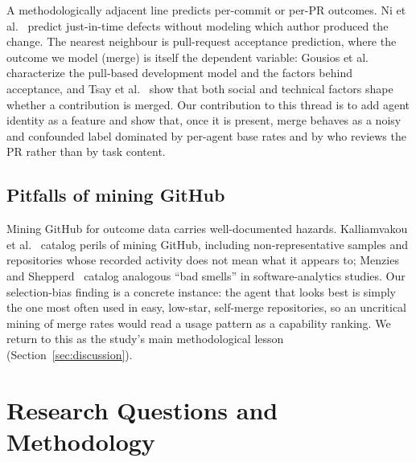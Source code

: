 \documentclass[sigconf,nonacm]{acmart}
\begin{document}
A methodologically adjacent line predicts per-commit or per-PR outcomes. Ni et al.~\cite{ni2022jit} predict just-in-time defects without modeling which author produced the change. The nearest neighbour is pull-request acceptance prediction, where the outcome we model (merge) is itself the dependent variable: Gousios et al.~\cite{gousios2014pullbased} characterize the pull-based development model and the factors behind acceptance, and Tsay et al.~\cite{tsay2014influence} show that both social and technical factors shape whether a contribution is merged. Our contribution to this thread is to add agent identity as a feature and show that, once it is present, merge behaves as a noisy and confounded label dominated by per-agent base rates and by who reviews the PR rather than by task content.

\subsection{Pitfalls of mining GitHub}

Mining GitHub for outcome data carries well-documented hazards. Kalliamvakou et al.~\cite{kalliamvakou2016promises} catalog perils of mining GitHub, including non-representative samples and repositories whose recorded activity does not mean what it appears to; Menzies and Shepperd~\cite{menzies2019badsmells} catalog analogous ``bad smells'' in software-analytics studies. Our selection-bias finding is a concrete instance: the agent that looks best is simply the one most often used in easy, low-star, self-merge repositories, so an uncritical mining of merge rates would read a usage pattern as a capability ranking. We return to this as the study's main methodological lesson (Section~\ref{sec:discussion}).

\section{Research Questions and Methodology}
\end{document}
